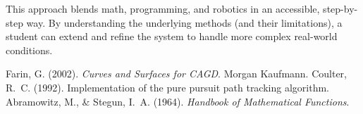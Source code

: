 \documentclass[11pt]{article}
\begin{document}
This approach blends math, programming, and robotics in an accessible, step-by-step way. By understanding the underlying methods (and their limitations), a student can extend and refine the system to handle more complex real-world conditions.

\newpage

\begin{thebibliography}{9}
Farin, G. (2002). \emph{Curves and Surfaces for CAGD}. Morgan Kaufmann.
Coulter, R.~C. (1992). Implementation of the pure pursuit path tracking algorithm.
Abramowitz, M., \& Stegun, I.~A. (1964). \emph{Handbook of Mathematical Functions}.
\end{thebibliography}
\end{document}
